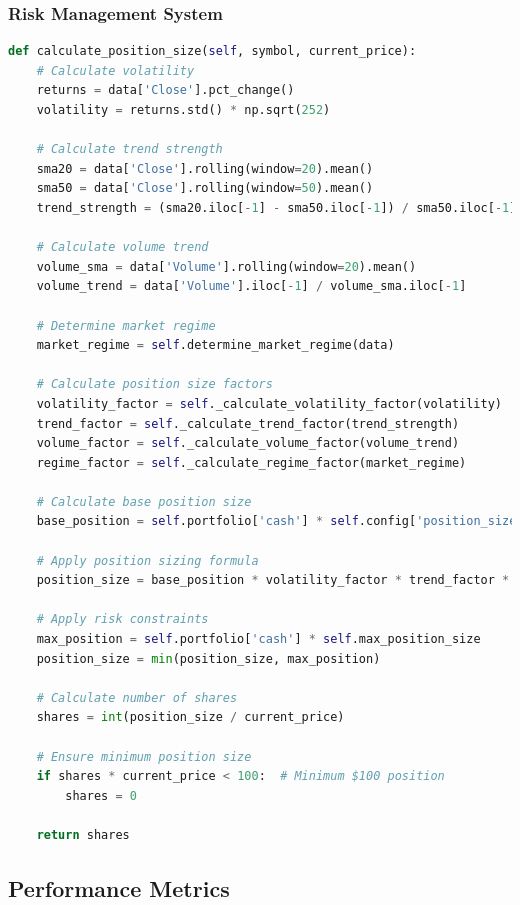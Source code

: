 \documentclass[conference]{IEEEtran}
\begin{document}
\subsubsection{Risk Management System}
\begin{lstlisting}[language=Python]
def calculate_position_size(self, symbol, current_price):
    # Calculate volatility
    returns = data['Close'].pct_change()
    volatility = returns.std() * np.sqrt(252)
    
    # Calculate trend strength
    sma20 = data['Close'].rolling(window=20).mean()
    sma50 = data['Close'].rolling(window=50).mean()
    trend_strength = (sma20.iloc[-1] - sma50.iloc[-1]) / sma50.iloc[-1]
    
    # Calculate volume trend
    volume_sma = data['Volume'].rolling(window=20).mean()
    volume_trend = data['Volume'].iloc[-1] / volume_sma.iloc[-1]
    
    # Determine market regime
    market_regime = self.determine_market_regime(data)
    
    # Calculate position size factors
    volatility_factor = self._calculate_volatility_factor(volatility)
    trend_factor = self._calculate_trend_factor(trend_strength)
    volume_factor = self._calculate_volume_factor(volume_trend)
    regime_factor = self._calculate_regime_factor(market_regime)
    
    # Calculate base position size
    base_position = self.portfolio['cash'] * self.config['position_size']
    
    # Apply position sizing formula
    position_size = base_position * volatility_factor * trend_factor * volume_factor * regime_factor
    
    # Apply risk constraints
    max_position = self.portfolio['cash'] * self.max_position_size
    position_size = min(position_size, max_position)
    
    # Calculate number of shares
    shares = int(position_size / current_price)
    
    # Ensure minimum position size
    if shares * current_price < 100:  # Minimum $100 position
        shares = 0
    
    return shares
\end{lstlisting}

\subsection{Performance Metrics}
\end{document}
